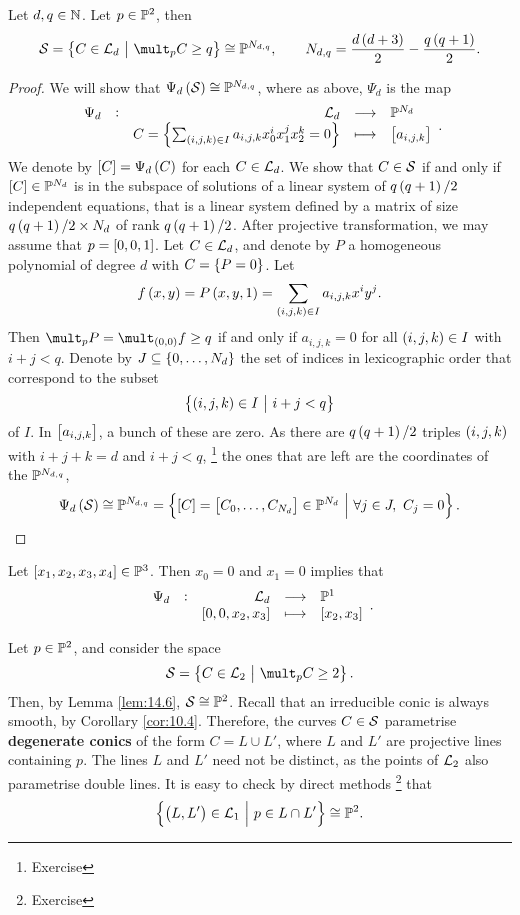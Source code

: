 \begin{lemma}
\label{lem:14.6}
Let $ d, q \in \mathbb{N} $. Let $ p \in \mathbb{P}^2 $, then
$$ \SSS = \cbr{C \in \LLL_d \st \mult_p C \ge q} \cong \PP^{N_{d, q}}, \qquad N_{d, q} = \dfrac{d\br{d + 3}}{2} - \dfrac{q\br{q + 1}}{2}. $$
\end{lemma}

\pagebreak

\begin{proof}
We will show that $ \Psi_d\br{\SSS} \cong \PP^{N_{d, q}} $, where as above, $ \Psi_d $ is the map
$$ \function[\Psi_d]{\LLL_d}{\PP^{N_d}}{C = \cbr{\sum_{\br{i, j, k} \in I} a_{i, j, k}x_0^ix_1^jx_2^k = 0}}{\sbr{a_{i, j, k}}}. $$
We denote by $ \sbr{C} = \Psi_d\br{C} $ for each $ C \in \mathcal{L}_d $. We show that $ C \in \mathcal{S} $ if and only if $ \sbr{C} \in \PP^{N_d} $ is in the subspace of solutions of a linear system of $ q\br{q + 1} / 2 $ independent equations, that is a linear system defined by a matrix of size $ q\br{q + 1} / 2 \times N_d $ of rank $ q\br{q + 1} / 2 $. After projective transformation, we may assume that $ p = \sbr{0, 0, 1} $. Let $ C \in \mathcal{L}_d $, and denote by $ P $ a homogeneous polynomial of degree $ d $ with $ C = \cbr{P = 0} $. Let
$$ f\br{x, y} = P\br{x, y, 1} = \sum_{\br{i, j, k} \in I} a_{i, j, k}x^iy^j. $$
Then $ \mult_p P = \mult_{\br{0, 0}} f \ge q $ if and only if $ a_{i, j, k} = 0 $ for all $ \br{i, j, k} \in I $ with $ i + j < q $. Denote by $ J \subseteq \cbr{0, \dots, N_d} $ the set of indices in lexicographic order that correspond to the subset
$$ \cbr{\br{i, j, k} \in I \st i + j < q} $$
of $ I $. In $ \sbr{a_{i, j, k}} $, a bunch of these are zero. As there are $ q\br{q + 1} / 2 $ triples $ \br{i, j, k} $ with $ i + j + k = d $ and $ i + j < q $, \footnote{Exercise} the ones that are left are the coordinates of the $ \mathbb{P}^{N_{d, q}} $,
$$ \Psi_d\br{\SSS} \cong \PP^{N_{d, q}} = \cbr{\sbr{C} = \sbr{C_0, \dots, C_{N_d}} \in \PP^{N_d} \st \forall j \in J, \ C_j = 0}. $$
\end{proof}

\begin{example*}
Let $ \sbr{x_1, x_2, x_3, x_4} \in \PP^3 $. Then $ x_0 = 0 $ and $ x_1 = 0 $ implies that
$$ \function[\Psi_d]{\LLL_d}{\PP^1}{\sbr{0, 0, x_2, x_3}}{\sbr{x_2, x_3}}. $$
\end{example*}

\begin{example}
Let $ p \in \mathbb{P}^2 $, and consider the space
$$ \SSS = \cbr{C \in \LLL_2 \st \mult_p C \ge 2}. $$
Then, by Lemma \ref{lem:14.6}, $ \mathcal{S} \cong \mathbb{P}^2 $. Recall that an irreducible conic is always smooth, by Corollary \ref{cor:10.4}. Therefore, the curves $ C \in \mathcal{S} $ parametrise \textbf{degenerate conics} of the form $ C = L \cup L' $, where $ L $ and $ L' $ are projective lines containing $ p $. The lines $ L $ and $ L' $ need not be distinct, as the points of $ \mathcal{L}_2 $ also parametrise double lines. It is easy to check by direct methods \footnote{Exercise} that
$$ \cbr{\br{L, L'} \in \LLL_1 \st p \in L \cap L'} \cong \PP^2. $$
\end{example}

